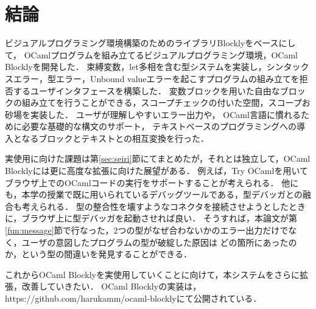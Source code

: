 \chapter {結論}\label{chap:conclusion}

ビジュアルプログラミング環境構築のためのライブラリBlocklyをベースにして，
OCamlプログラムを組み立てるビジュアルプログラミング環境，OCaml Blocklyを開発した．
束縛変数，let多相を含む型システムを実装し，シンタックスエラー，型エラー，Unbound valueエラーを起こすプログラムの組み立てを拒否するユーザインタフェースを構築した．
変数ブロックを用いた自由なブロックの組み立てを行うことができる，スコープチェックの付いた空間，スコープお砂場を実装した．
ユーザが理解しやすいエラー出力や，
OCaml言語に慣れるために必要な基礎的な構文のサポート，
テキストベースのプログラミングへの導入となるブロックとテキストとの相互変換を行った．

実使用に向けた課題は第\ref{sec:seiri}節にてまとめたが，それとは独立して，OCaml Blocklyには更に高度な拡張に向けた展望がある．
例えば，Try OCamlを用いてブラウザ上でのOCamlコードの実行をサポートすることが考えられる．
他にも，本学の授業で既に用いられているデバッグツールである，型デバッガ\cite{10.1007/978-3-642-41582-1_12}との融合も考えられる．
型の整合性を壊すようなコネクタを接続させようとしたときに，ブラウザ上に型デバッガを起動させれば良い．
そうすれば，本論文が第\ref{fun:message}節で行なった，2つの型がなぜ合わないかのエラー出力だけでなく，ユーザの意図したプログラムの型が破綻した原因は
どの箇所にあったのか，という型の間違いを発見することができる．

これからOCaml Blocklyを実使用していくことに向けて，本システムをさらに拡張，改善していきたい．
OCaml Blocklyの実装は，https://github.com/harukamm/ocaml-blocklyにて公開されている．

